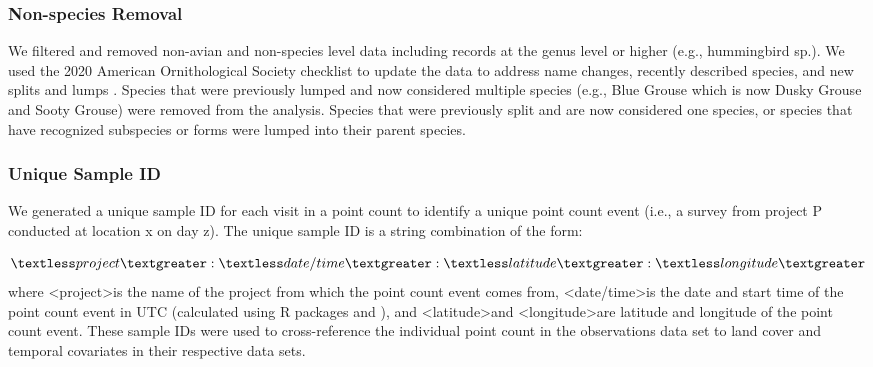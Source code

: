 \subsubsection{Non-species Removal}
\par We filtered and removed non-avian and non-species level data including records at the genus level or higher (e.g., hummingbird sp.). We used the 2020 American Ornithological Society checklist to update the data to address name changes, recently described species, and new splits and lumps \citep{chesser_sixty-first_2020}. Species that were previously lumped and now considered multiple species (e.g., Blue Grouse which is now Dusky Grouse and Sooty Grouse) were removed from the analysis. Species that were previously split and are now considered one species, or species that have recognized subspecies or forms were lumped into their parent species. 

\subsubsection{Unique Sample ID}
\par We generated a unique sample ID for each visit in a point count to identify a unique point count event (i.e., a survey from project P conducted at location x on day z). The unique sample ID is a string combination of the form:

 $$\textless project\textgreater:\textless date/time\textgreater:\textless latitude\textgreater:\textless longitude\textgreater$$
 where \textless project\textgreater  is the name of the project from which the point count event comes from, \textless date/time\textgreater  is the date and start time of the point count event in UTC (calculated using R packages \citep{teucher_lutz_2019} and \citep{urbanek_proj4_2020}), and \textless latitude\textgreater  and \textless longitude\textgreater  are latitude and longitude of the point count event. These sample IDs were used to cross-reference the individual point count in the observations data set to land cover and temporal covariates in their respective data sets.

